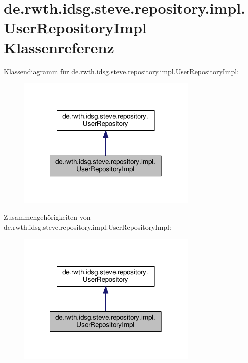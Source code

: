 \hypertarget{classde_1_1rwth_1_1idsg_1_1steve_1_1repository_1_1impl_1_1_user_repository_impl}{\section{de.\-rwth.\-idsg.\-steve.\-repository.\-impl.\-User\-Repository\-Impl Klassenreferenz}
\label{classde_1_1rwth_1_1idsg_1_1steve_1_1repository_1_1impl_1_1_user_repository_impl}
}


Klassendiagramm für de.\-rwth.\-idsg.\-steve.\-repository.\-impl.\-User\-Repository\-Impl\-:\nopagebreak
\begin{figure}[H]
\begin{center}
\leavevmode
\includegraphics[width=246pt]{classde_1_1rwth_1_1idsg_1_1steve_1_1repository_1_1impl_1_1_user_repository_impl__inherit__graph}
\end{center}
\end{figure}


Zusammengehörigkeiten von de.\-rwth.\-idsg.\-steve.\-repository.\-impl.\-User\-Repository\-Impl\-:\nopagebreak
\begin{figure}[H]
\begin{center}
\leavevmode
\includegraphics[width=246pt]{classde_1_1rwth_1_1idsg_1_1steve_1_1repository_1_1impl_1_1_user_repository_impl__coll__graph}
\end{center}
\end{figure}
